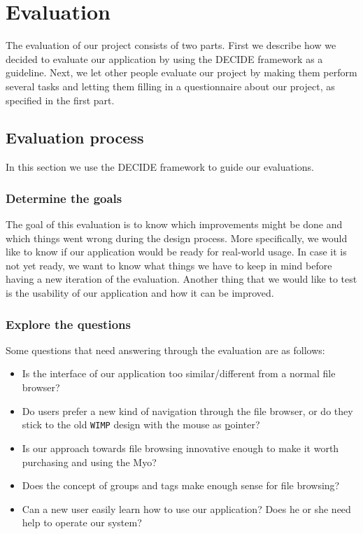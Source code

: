 \documentclass{article}
\begin{document}
\section{Evaluation}

The evaluation of our project consists of two parts. First we describe how we decided to evaluate our application by using the DECIDE framework as a guideline. Next, we let other people evaluate our project by making them perform several tasks and letting them filling in a questionnaire about our project, as specified in the first part.

\subsection{Evaluation process}
In this section we use the DECIDE framework to guide our evaluations.

\subsubsection{\textbf{D}etermine the goals}
The goal of this evaluation is to know which improvements might be done and which things went wrong during the design process. More specifically, we would like to know if our application would be ready for real-world usage. In case it is not yet ready, we want to know what things we have to keep in mind before having a new iteration of the evaluation. Another thing that we would like to test is the usability of our application and how it can be improved. 

\subsubsection{\textbf{E}xplore the questions}

Some questions that need answering through the evaluation are as follows:
\begin{itemize}
\item Is the interface of our application too similar/different from a normal file browser?
\item Do users prefer a new kind of navigation through the file browser, or do they stick to the old \texttt{WIMP} design with the mouse as \underline{p}ointer?
\item Is our approach towards file browsing innovative enough to make it worth purchasing and using the Myo?
\item Does the concept of groups and tags make enough sense for file browsing?
\item Can a new user easily learn how to use our application? Does he or she need help to operate our system?
\end{itemize}
\end{document}
